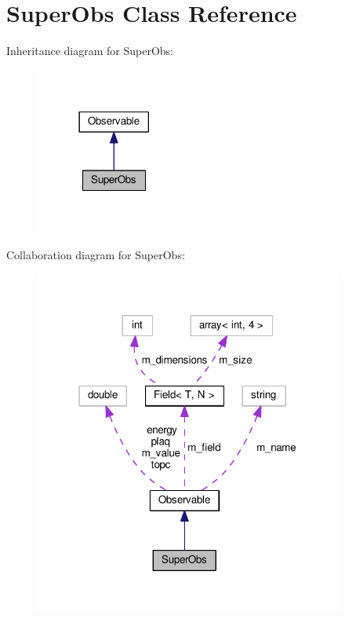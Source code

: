 \hypertarget{classSuperObs}{}\section{Super\+Obs Class Reference}
\label{classSuperObs}


Inheritance diagram for Super\+Obs\+:
\nopagebreak
\begin{figure}[H]
\begin{center}
\leavevmode
\includegraphics[width=146pt]{classSuperObs__inherit__graph}
\end{center}
\end{figure}


Collaboration diagram for Super\+Obs\+:
\nopagebreak
\begin{figure}[H]
\begin{center}
\leavevmode
\includegraphics[width=288pt]{classSuperObs__coll__graph}
\end{center}
\end{figure}
